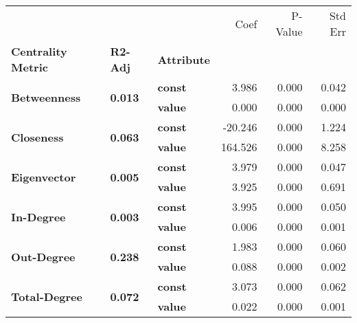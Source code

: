 \begin{tabular}{lllrrr}
\toprule
             &       &       &    Coef &  P-Value &  Std Err \\
\textbf{Centrality Metric} & \textbf{R2-Adj} & \textbf{Attribute} &         &          &          \\
\midrule
\multirow{2}{*}{\textbf{Betweenness}} & \multirow{2}{*}{\textbf{0.013}} & \textbf{const} &   3.986 &    0.000 &    0.042 \\
             &       & \textbf{value} &   0.000 &    0.000 &    0.000 \\
\cline{1-6}
\cline{2-6}
\multirow{2}{*}{\textbf{Closeness}} & \multirow{2}{*}{\textbf{0.063}} & \textbf{const} & -20.246 &    0.000 &    1.224 \\
             &       & \textbf{value} & 164.526 &    0.000 &    8.258 \\
\cline{1-6}
\cline{2-6}
\multirow{2}{*}{\textbf{Eigenvector}} & \multirow{2}{*}{\textbf{0.005}} & \textbf{const} &   3.979 &    0.000 &    0.047 \\
             &       & \textbf{value} &   3.925 &    0.000 &    0.691 \\
\cline{1-6}
\cline{2-6}
\multirow{2}{*}{\textbf{In-Degree}} & \multirow{2}{*}{\textbf{0.003}} & \textbf{const} &   3.995 &    0.000 &    0.050 \\
             &       & \textbf{value} &   0.006 &    0.000 &    0.001 \\
\cline{1-6}
\cline{2-6}
\multirow{2}{*}{\textbf{Out-Degree}} & \multirow{2}{*}{\textbf{0.238}} & \textbf{const} &   1.983 &    0.000 &    0.060 \\
             &       & \textbf{value} &   0.088 &    0.000 &    0.002 \\
\cline{1-6}
\cline{2-6}
\multirow{2}{*}{\textbf{Total-Degree}} & \multirow{2}{*}{\textbf{0.072}} & \textbf{const} &   3.073 &    0.000 &    0.062 \\
             &       & \textbf{value} &   0.022 &    0.000 &    0.001 \\
\bottomrule
\end{tabular}
